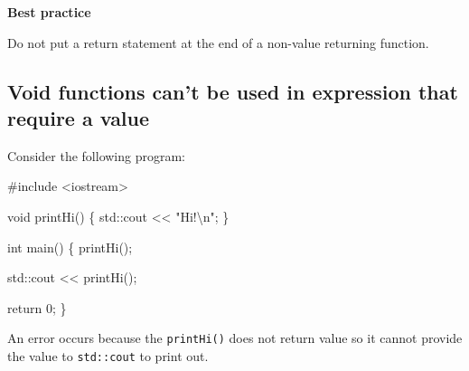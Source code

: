 \documentclass[
  letterpaper,
  DIV=11,
  numbers=noendperiod]{scrreprt}
\newenvironment{Shaded}{\begin{snugshade}}{\end{snugshade}}
\newcommand{\CommentTok}[1]{\textcolor[rgb]{0.37,0.37,0.37}{#1}}
\newcommand{\DecValTok}[1]{\textcolor[rgb]{0.68,0.00,0.00}{#1}}
\newcommand{\ErrorTok}[1]{\textcolor[rgb]{0.68,0.00,0.00}{#1}}
\newcommand{\FunctionTok}[1]{\textcolor[rgb]{0.28,0.35,0.67}{#1}}
\newcommand{\NormalTok}[1]{\textcolor[rgb]{0.00,0.23,0.31}{#1}}
\newcommand{\SpecialCharTok}[1]{\textcolor[rgb]{0.37,0.37,0.37}{#1}}
\newcommand{\StringTok}[1]{\textcolor[rgb]{0.13,0.47,0.30}{#1}}
\begin{document}
\begin{tcolorbox}[enhanced jigsaw, toprule=.15mm, rightrule=.15mm, opacityback=0, breakable, leftrule=.75mm, colback=white, colframe=quarto-callout-tip-color-frame, arc=.35mm, left=2mm, bottomrule=.15mm]
\begin{minipage}[t]{5.5mm}
\textcolor{quarto-callout-tip-color}{\faLightbulb}
\end{minipage}%
\begin{minipage}[t]{\textwidth - 5.5mm}

\textbf{Best practice}\vspace{2mm}

Do not put a return statement at the end of a non-value returning
function.

\end{minipage}%
\end{tcolorbox}

\hypertarget{void-functions-cant-be-used-in-expression-that-require-a-value}{%
\subsection*{Void functions can't be used in expression that require a
value}\label{void-functions-cant-be-used-in-expression-that-require-a-value}}

Consider the following program:

\begin{Shaded}
\begin{Highlighting}[]
\CommentTok{\#include \textless{}iostream\textgreater{}}

\NormalTok{void }\FunctionTok{printHi}\NormalTok{()}
\NormalTok{\{}
\NormalTok{    std}\SpecialCharTok{::}\NormalTok{cout }\SpecialCharTok{\textless{}}\ErrorTok{\textless{}} \StringTok{"Hi!}\SpecialCharTok{\textbackslash{}n}\StringTok{"}\NormalTok{;}
\NormalTok{\}}

\NormalTok{int }\FunctionTok{main}\NormalTok{()}
\NormalTok{\{}
    \FunctionTok{printHi}\NormalTok{();}

\NormalTok{    std}\SpecialCharTok{::}\NormalTok{cout }\SpecialCharTok{\textless{}}\ErrorTok{\textless{}} \FunctionTok{printHi}\NormalTok{();}

\NormalTok{    return }\DecValTok{0}\NormalTok{;}
\NormalTok{\}}
\end{Highlighting}
\end{Shaded}

An error occurs because the \texttt{printHi()} does not return value so
it cannot provide the value to \texttt{std::cout} to print out.
\end{document}
